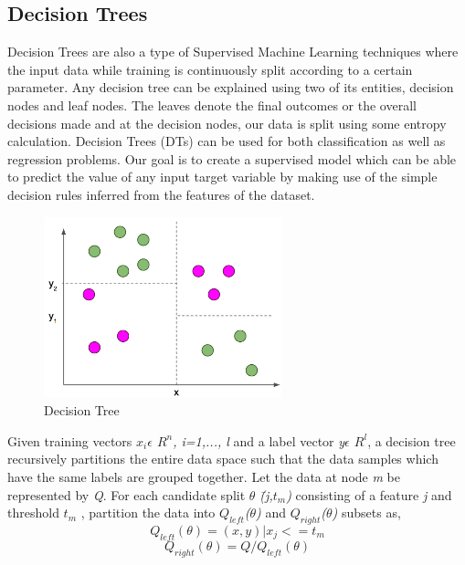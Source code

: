 \documentclass[a4paper, 10pt, conference]{IEEEtran}
\begin{document}
\subsection{Decision Trees}
Decision Trees are also a type of Supervised Machine Learning techniques where the input data while training is continuously split according to a certain parameter. Any decision tree can be explained using two of its entities, decision nodes and leaf nodes. The leaves denote the final outcomes or the overall decisions made and at the decision nodes, our data is split using some entropy calculation.
Decision Trees (DTs) can be used for both classification as well as regression problems. Our goal is to create a supervised model which can be able to predict the value of any input target variable by making use of the simple decision rules inferred from the features of the dataset.
\begin{figure}
  \includegraphics[width=\linewidth]{DecisionTree.png}
  \caption{Decision Tree}
  \label{fig:dt}
\end{figure}

Given training vectors \textit{$x_{i}\epsilon$ $R^{n}$, i=1,..., l} and a label  vector \textit{y$\epsilon$ $R^{l}$}, a decision tree recursively partitions the entire data space such that the data samples which have the same labels are grouped together.
Let the data at node \textit{m} be represented by \textit{Q}. For each candidate split \textit{$\theta$ \= (j,$t_{m}$)} consisting of a feature \textit{j} and threshold \textit{$t_{m}$} , partition the data into \textit{$Q_{left}$($\theta$)} and \textit{$Q_{right}$($\theta$)} subsets as,
\[ Q_{left}(\theta) = (x,y)|x_{j}<=t_{m}
\]
\[ Q_{right}(\theta) = Q/Q_{left}(\theta)
\]
\end{document}
